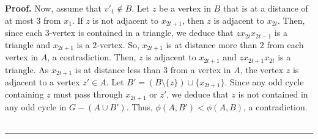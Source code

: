 \documentclass[10pt,a4paper]{amsart}
\newenvironment{proof}[1][Proof]{\textbf{#1.} }{\ \rule{0.5em}{0.5em}}
\begin{document}
\begin{proof}
Now, assume that $v'_1\notin B$. Let $z$ be a vertex in $B$ that is at a distance of at most $3$ from $x_1$. If $z$ is not adjacent to $x_{2t+1}$, then $z$ is adjacent to $x_{2t}$. Then, since each $3$-vertex is contained in a triangle, we deduce that $zx_{2t}x_{2t-1}$ is a triangle and $x_{2t+1}$ is a $2$-vertex. So, $x_{2t+1}$ is at distance more than $2$ from each vertex in $A$, a contradiction. Then, $z$ is adjacent to $x_{2t+1}$ and $zx_{2t+1}x_{2t}$ is a triangle. As $x_{2t+1}$ is at distance less than $3$ from a vertex in $A$, the vertex $z$ is adjacent to a vertex $z'\in A$. Let $B'=(B\setminus \{z\})\cup \{x_{2t+1}\}$. Since any odd cycle containing $z$ must pass through $x_{2t+1}$ or $z'$, we deduce that $z$ is not contained in any odd cycle in $G-(A\cup B')$. Thus, $\phi(A,B')<\phi(A,B)$, a contradiction.
\end{proof}  
\end{document}
